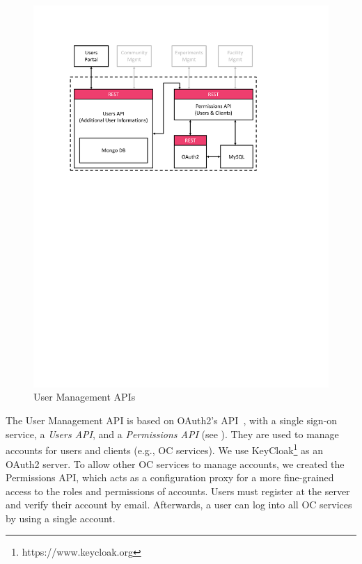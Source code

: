\begin{figure}
    \centering 
	\includegraphics[scale = .5]{figures/user}
	\caption{User Management APIs}
	\label{fig:user}	
\end{figure}

The User Management API is based on OAuth2's API~\cite{rfc6749}, with a single sign-on service, a \emph{Users API}, and a \emph{Permissions API} (see ). They are used to manage accounts for users and clients (e.g., OC services). We use KeyCloak\footnote{https://www.keycloak.org} as an OAuth2 server. %
To allow other OC services to manage accounts, we created the Permissions API, which acts as a configuration proxy for a more fine-grained access to the roles and permissions of accounts. Users must register at the server and verify their account by email. Afterwards, a user can log into all OC services by using a single account. %

